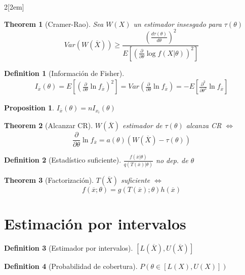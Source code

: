 \documentclass[leqno]{article}
\newtheorem*{theorem}{Theorem}
\newtheorem*{proposition}{Proposition}
\newtheorem*{definition}{Definition}
\begin{document}
\begin{multicols}{2}[\columnsep2em]
\begin{theorem}[Cramer-Rao] Sea $W(X)$ un estimador insesgado para $\tau (\theta )$
  \[
	Var(W(\overline{X}))\ge \frac{\left(\frac{d \tau (\theta )}{d \theta } \right)^2}{E\left[ \left( \frac{\partial}{\partial\theta } \log f(X|\theta ) \right)^2 \right]}
  \] 
\end{theorem}

\begin{definition}[Información de Fisher]
  \begin{align*}
  I_{\overline{x}}(\theta ) = E\left[ \left(  \frac{\partial}{\partial \theta } \ln f_{\overline{x}} \right) ^2 \right]  = Var\left(\frac{\partial}{\partial \theta }\ln f_{\overline{x}}\right) =  -E\left[  \frac{\partial^2}{\partial \theta ^2} \ln f_{\overline{x}} \right]
  \end{align*}
\end{definition}

\begin{proposition} $I_{\overline{x}}(\theta ) = nI_{x_i}(\theta )$
\end{proposition}

\begin{theorem}[Alcanzar CR] $W(\overline{X})$ estimador de $\tau (\theta )$ alcanza CR  $\iff$
\[
\frac{\partial}{\partial \theta } \ln f_{\overline{x}} = a(\theta )(W(\overline{X})-\tau (\theta ))
\] 
\end{theorem}

\begin{definition}[Estadístico suficiente] $\frac{f(\overline{x}|\theta )}{q(T(\overline{x})|\theta )}$ no dep. de $\theta $
\end{definition}

\begin{theorem}[Factorización] $T(\overline{X})$ suficiente $\iff$ 
\[
f(\overline{x}; \theta ) = g(T(\overline{x});\theta )h(\overline{x})
\] 
\end{theorem}


\section{Estimación por intervalos}

\begin{definition}[Estimador por intervalos] $[L(\overline{X}), U(\overline{X})]$
\end{definition}

\begin{definition}[Probabilidad de cobertura]
$P(\theta \in [L(X), U(X)])$
\end{definition}


\end{multicols}
\end{document}
